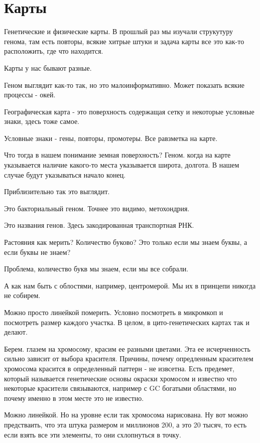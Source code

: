 ﻿\section{Карты}

Генетические и физические карты. В прошлый 
раз мы изучали струкутуру 
генома, там есть повторы, всякие хитрые штуки и 
задача карты все это как-то расположить, где что находится. 

Карты у нас бывают разные. 

Геном выглядит как-то так, но это малоинформативно. Может 
показать всякие процессы - окей. 

Географическая карта - это 
поверхность содержащая сетку и некоторые условные знаки, 
здесь тоже самое. 

Условные знаки - гены, повторы, промотеры. Все равзметка на 
карте. 

Что тогда в нашем понимание земная поверхность? Геном. 
когда на карте указывается наличие какого-то места указывается 
широта, долгота. В нашем случае будут указываться начало конец. 

Приблизительно так это выглядит. 

Это бакториальный геном. Точнее это видимо, метохондрия. 

Это названия генов. Здесь
закодированная транспортная РНК.

Растояния как мерить? Количество буково?
Это только если мы знаем буквы, а если буквы не знаем?

Проблема, количество букв мы знаем, если
мы все собрали.

А как нам быть с облостями, например,
центромерой. Мы их в принцепи никогда не собирем.

Можно просто линейкой померить. Условно посмотреть в микромкоп
и посмотреть размер каждого участка. В целом,
в цито-генетических картах так и делают.

Берем. глазем на хромосому, красим ее разными цветами.
Эта ее исчерченность сильно зависит от выбора красителя.
Причины, почему опредленным красителем хромосома красится в определенный паттерн -
не извсетна. Есть предемет, который называется
генетические основы окраски хромосом и известно
что некоторые красители связываются, например с GC богатыми
областями, но почему именно в этом месте это не известно.

Можно линейкой. Но на уровне если так
хромосома нарисована. Ну вот можно предстваить,
что эта штука размером и миллионов 200,
а это 20 тысяч, то есть если взять
все эти элементы, то они схлопнуться
в точку.

